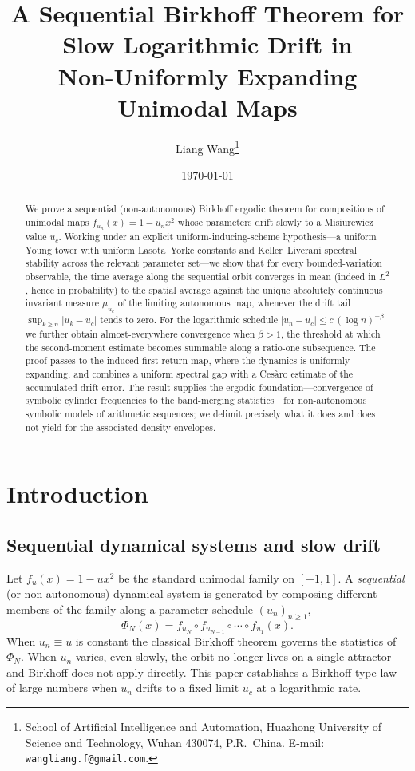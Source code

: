 \documentclass[11pt,a4paper]{article}
\title{A Sequential Birkhoff Theorem for\\
       Slow Logarithmic Drift in\\
       Non-Uniformly Expanding Unimodal Maps}
\author{Liang Wang\thanks{School of Artificial Intelligence and
Automation, Huazhong University of Science and Technology, Wuhan
430074, P.R.\ China. E-mail: \texttt{wangliang.f@gmail.com}.}}
\date{\today}
\theoremstyle{definition}
\begin{document}
\maketitle

\begin{abstract}
We prove a sequential (non-autonomous) Birkhoff ergodic theorem for
compositions of unimodal maps $f_{u_n}(x) = 1 - u_n x^2$ whose
parameters drift slowly to a Misiurewicz value $u_c$. Working under an
explicit uniform-inducing-scheme hypothesis---a uniform Young tower
with uniform Lasota--Yorke constants and Keller--Liverani spectral
stability across the relevant parameter set---we show that for every
bounded-variation observable, the time average along the sequential
orbit converges in mean (indeed in $L^2$, hence in probability) to the
spatial average against the unique absolutely continuous invariant
measure $\mu_{u_c}$ of the limiting autonomous map, whenever the drift
tail $\sup_{k\ge n}|u_k - u_c|$ tends to zero. For the logarithmic
schedule $|u_n - u_c| \le c\,(\log n)^{-\beta}$ we further obtain
almost-everywhere convergence when $\beta > 1$, the threshold at which
the second-moment estimate becomes summable along a ratio-one
subsequence. The proof passes to the induced first-return map, where
the dynamics is uniformly expanding, and combines a uniform spectral
gap with a Cesàro estimate of the accumulated drift error. The result
supplies the ergodic foundation---convergence of symbolic cylinder
frequencies to the band-merging statistics---for non-autonomous
symbolic models of arithmetic sequences; we delimit precisely what it
does and does not yield for the associated density envelopes.
\end{abstract}

\section{Introduction}
\label{sec:intro}

\subsection{Sequential dynamical systems and slow drift}

Let $f_u(x) = 1 - u x^2$ be the standard unimodal family on $[-1,1]$.
A \emph{sequential} (or non-autonomous) dynamical system is generated
by composing different members of the family along a parameter
schedule $(u_n)_{n\ge 1}$,
\begin{equation}
\label{eq:cocycle}
  \Phi_N(x) = f_{u_N}\circ f_{u_{N-1}}\circ\cdots\circ f_{u_1}(x).
\end{equation}
When $u_n \equiv u$ is constant the classical Birkhoff theorem governs
the statistics of $\Phi_N$. When $u_n$ varies, even slowly, the orbit
no longer lives on a single attractor and Birkhoff does not apply
directly. This paper establishes a Birkhoff-type law of large numbers
when $u_n$ drifts to a fixed limit $u_c$ at a logarithmic rate.
\end{document}
